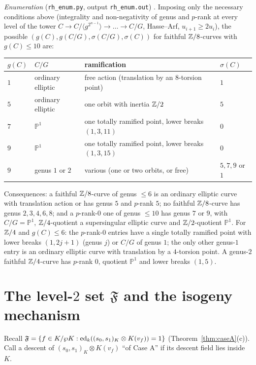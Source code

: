 \emph{Enumeration} (\texttt{rh\_enum.py}, output \texttt{rh\_enum.out}) .
Imposing only the necessary conditions above (integrality and non-negativity of genus and
$p$-rank at every level of the tower $C\to C/\langle g^{2^{n-1}}\rangle\to\dots\to C/G$,
Hasse--Arf, $u_{i+1}\ge2u_i$), the possible $(g(C),g(C/G),\sigma(C/G),\sigma(C))$ for
faithful $\mathbb Z/8$-curves with $g(C)\le10$ are:
\begin{center}\small
\begin{tabular}{@{}llll@{}}
\toprule
$g(C)$ & $C/G$ & ramification & $\sigma(C)$\\
\midrule
$1$ & ordinary elliptic & free action (translation by an $8$-torsion point) & $1$\\
$5$ & ordinary elliptic & one orbit with inertia $\mathbb Z/2$ & $5$\\
$7$ & $\mathbb P^1$ & one totally ramified point, lower breaks $(1,3,11)$ & $0$\\
$9$ & $\mathbb P^1$ & one totally ramified point, lower breaks $(1,3,15)$ & $0$\\
$9$ & genus $1$ or $2$ & various (one or two orbits, or free) & $5,7,9$ or $1$\\
\bottomrule
\end{tabular}
\end{center}
Consequences: a faithful $\mathbb Z/8$-curve of genus $\le6$ is an ordinary elliptic curve
with translation action or has genus $5$ and $p$-rank $5$; no faithful $\mathbb Z/8$-curve has
genus $2,3,4,6,8$; and a $p$-rank-$0$ one of genus $\le10$ has genus $7$ or $9$, with
$C/G=\mathbb P^1$, $\mathbb Z/4$-quotient a supersingular elliptic curve and $\mathbb Z/2$-quotient
$\mathbb P^1$. For $\mathbb Z/4$ and $g(C)\le6$: the $p$-rank-$0$ entries have a single totally
ramified point with lower breaks $(1,2j+1)$ (genus $j$) or $C/G$ of genus $1$; the only
other genus-$1$ entry is an ordinary elliptic curve with translation by a $4$-torsion
point. A genus-$2$ faithful $\mathbb Z/4$-curve has $p$-rank $0$, quotient $\mathbb P^1$ and
lower breaks $(1,5)$.

\section{The level-\texorpdfstring{$2$}{2} set \texorpdfstring{$\mathfrak F$}{F} and the
isogeny mechanism}\label{app:isog}

Recall $\mathfrak F=\{f\in K/\wp K:\operatorname{ed}_k((s_0,s_1)_K\otimes K(v_f))=1\}$
(Theorem~\ref{thm:caseA}(c)). Call a descent of $(s_0,s_1)_K\otimes K(v_f)$ ``of Case A''
if its descent field lies inside $K$.

